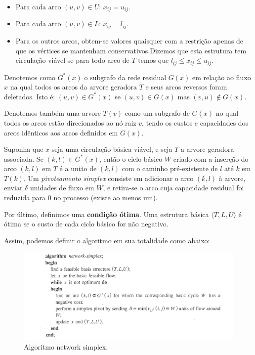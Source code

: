 \documentclass[12pt, a4]{article}
\begin{document}
\begin{itemize}
\item Para cada arco $(u,v) \in U$: $x_{ij} = u_{ij}$.

\item Para cada arco $(u,v) \in L$: $x_{ij} = l_{ij}$.

\item Para os outros arcos, obtem-se valores quaisquer com a restrição apenas de
    que os vértices se mantenham conservativos.Dizemos que esta estrutura tem
    circulação viável se para todo arco de $T$ temos que
    $l_{ij} \leq x_{ij} \leq u_{ij}$.
\end{itemize}

Denotemos como $G^*(x)$ o subgrafo da rede residual $G(x)$ em relação ao fluxo
$x$ na qual todos os arcos da arvore geradora $T$ e seus arcos reversos foram
deletados. Isto é: $(u,v) \in G^*(x)$ se $(u,v) \in G(x)$ mas
$(v,u) \notin G(x)$.

Denotemos também uma arvore $T(v)$ como um subgrafo de $G(x)$ no qual todos os
arcos estão direcionados ao nó raiz $v$, tendo os custos e capacidades dos arcos
idênticos aos arcos definidos em $G(x)$.

Suponha que $x$ seja uma circulação básica viável, e seja $T$ a arvore geradora
associada. Se $(k,l) \in G^*(x)$, então o ciclo básico $W$ criado com a inserção
do arco $(k,l)$ em $T$ é a união de $(k,l)$ com o caminho pré-existente de $l$
até $k$ em $T(k)$. Um \textit{pivoteamento simplex} consiste em adicionar o arco
$(k,l)$ à arvore, enviar $\delta$ unidades de fluxo em $W$, e retira-se o arco
cuja capacidade residual foi reduzida para $0$ no processo (existe ao menos um).

Por último, definimos uma \textbf{condição ótima}. Uma estrutura básica
$\langle T,L,U \rangle$ é ótima se o custo de cada ciclo básico for não
negativo.

Assim, podemos definir o algoritmo em sua totalidade como abaixo:

\begin{figure}[H]
  \includegraphics[width=\linewidth]{simplex.png}
  \caption{Algoritmo network simplex.}
  \label{fig:netwok-simplex-algorithm}
\end{figure}
\end{document}
